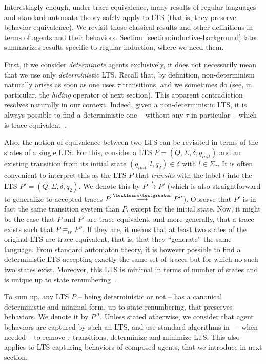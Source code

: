 Interestingly enough, under trace equivalence, many results of regular languages and standard automata theory safely apply to LTS (that is, they preserve behavior equivalence). We revisit those classical results and other definitions in terms of agents and their behaviors. Section~\ref{section:inductive-background} later summarizes results specific to regular induction, where we need them. 

First, if we consider \emph{determinate} agents exclusively, it does not necessarily mean that we use only \emph{deterministic} LTS. Recall that, by definition, non-determinism naturally arises as soon as one uses $\tau$ transitions, and we sometimes do (see, in particular, the \emph{hiding} operator of next section). This apparent contradiction resolves naturally in our context. Indeed, given a non-deterministic LTS, it is always possible to find a deterministic one -- without any $\tau$ in particular -- which is trace equivalent~\cite{Hopcroft:1979}.

Also, the notion of equivalence between two LTS can be revisited in terms of the states of a single LTS. For this, consider a LTS $P = (Q,\Sigma,\delta,q_{init})$ and an existing transition from its initial state $(q_{init},l,q_2) \in \delta$ with $l \in \Sigma_{\tau}$. It is often convenient to interpret this as the LTS $P$ that \emph{transits} with the label $l$ into the LTS $P' = (Q,\Sigma,\delta,q_{2})$. We denote this by $P \stackrel{l}{\longrightarrow} P'$ (which is also straightforward to generalize to accepted traces $P \stackrel{\textless s \textgreater}{\longrightarrow} P''$).  Observe that $P'$ is in fact the same transition system than $P$, except for the initial state. Now, it might be the case that $P$ and $P'$ are trace equivalent, and more generally, that a trace exists such that $P \equiv_{tr} P''$. If they are, it means that at least two states of the original LTS are trace equivalent, that is, that they ``generate'' the same language. From standard automaton theory, it is however possible to find a deterministic LTS accepting exactly the same set of traces but for which no such two states exist. Moreover, this LTS is minimal in terms of number of states and is unique up to state renumbering~\cite{Gold:1978}.

To sum up, any LTS $P$ -- being deterministic or not -- has a canonical deterministic and minimal form, up to state renumbering, that preserves behaviors. We denote it by $P^{\Delta}$. Unless stated otherwise, we consider that agent behaviors are captured by such an LTS, and use standard algorithms in~\cite{Hopcroft:1979} -- when needed -- to remove $\tau$ transitions, determinize and minimize LTS. This also applies to LTS capturing behaviors of composed agents, that we introduce in next section. 

